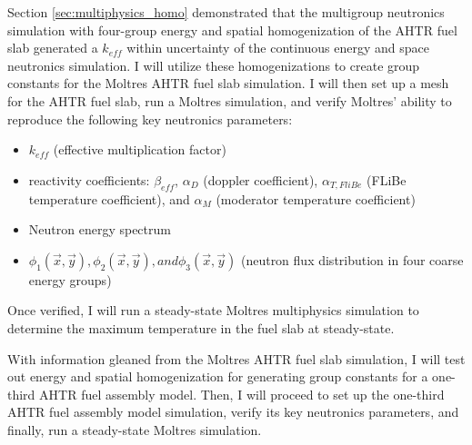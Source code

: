 Section \ref{sec:multiphysics_homo} demonstrated that the multigroup neutronics 
simulation with four-group energy and spatial homogenization of the \gls{AHTR} 
fuel slab generated a $k_{eff}$ within uncertainty of the continuous energy and 
space neutronics simulation. I will utilize these homogenizations to create 
group constants for the Moltres \gls{AHTR} fuel slab simulation. I will then 
set up a mesh for the \gls{AHTR} fuel slab, run a Moltres simulation, and 
verify Moltres' ability to reproduce the following key neutronics parameters: 
\begin{itemize}
  \item $k_{eff}$ (effective multiplication factor)
  \item reactivity coefficients: $\beta_{eff}$, $\alpha_D$ (doppler coefficient), 
  $\alpha_{T, FliBe}$ (\gls{FLiBe} temperature coefficient), and $\alpha_{M}$ 
  (moderator temperature coefficient)
  \item Neutron energy spectrum 
  \item $\phi_1(\vec{x},\vec{y}), \phi_2(\vec{x},\vec{y}), and \phi_3(\vec{x},\vec{y})$ 
  (neutron flux distribution in four coarse energy groups) 
\end{itemize}
Once verified, I will run a steady-state Moltres multiphysics simulation to 
determine the maximum temperature in the fuel slab at steady-state. 

With information gleaned from the Moltres \gls{AHTR} fuel slab simulation, I 
will test out energy and spatial homogenization for generating group constants 
for a one-third \gls{AHTR} fuel assembly model.  
Then, I will proceed to set up the one-third \gls{AHTR} fuel assembly model 
simulation, verify its key neutronics parameters, and finally, run a steady-state 
Moltres simulation.

